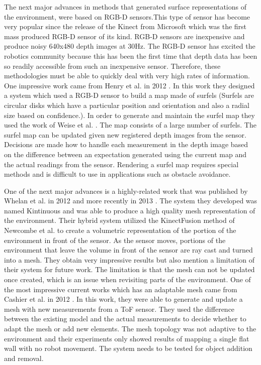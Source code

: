 The next major advances in methods that generated surface representations of the
environment, were based on RGB-D sensors.This type of sensor has become very
popular since the release of the Kinect from Microsoft which was the first mass
produced RGB-D sensor of its kind. RGB-D sensors are inexpensive and produce
noisy 640x480 depth images at 30Hz. The RGB-D sensor has excited the robotics
community because this has been the first time that depth data has been so
readily accessible from such an inexpensive sensor. Therefore, these
methodologies must be able to quickly deal with very high rates of information.
One impressive work came from Henry et al. in 2012 \cite{Henry2012}. In this
work they designed a system which used a RGB-D sensor to build a map made of
surfels (Surfels are circular disks which have a particular position and
orientation and also a radial size based on confidence.). In order to generate
and maintain the surfel map they used the work of Weise et al. \cite{Weise2009}.
The map consists of a large number of surfels. The surfel map can be updated
given new registered depth images from the sensor. Decisions are made how to
handle each measurement in the depth image based on the difference between an
expectation generated using the current map and the actual readings from the
sensor. Rendering a surfel map requires special methods \cite{Pfister2000} and
is difficult to use in applications such as obstacle avoidance.

One of the next major advances is a highly-related work that was published by
Whelan et al. in 2012 \cite{Whelan2012} and more recently in 2013
\cite{Whelan12tr}. The system they developed was named Kintinuous and was able
to produce a high quality mesh representation of the environment. Their hybrid
system utilized the KinectFusion method \cite{Newcombe2011a} of Newcombe et al.
to create a volumetric representation of the portion of the environment in front
of the sensor. As the sensor moves, portions of the environment that leave the
volume in front of the sensor are ray cast and turned into a mesh. They obtain
very impressive results but also mention a limitation of their system for future
work. The limitation is that the mesh can not be updated once created, which is
an issue when revisiting parts of the environment. One of the most impressive
current works which has an adaptable mesh came from Cashier et al. in 2012
\cite{Cahier2012}. In this work, they were able to generate and update a mesh
with new measurements from a ToF sensor. They used the difference between the
existing model and the actual measurements to decide whether to adapt the mesh
or add new elements. The mesh topology was not adaptive to the environment and
their experiments only showed results of mapping a single flat wall with no
robot movement. The system needs to be tested for object addition and removal.

